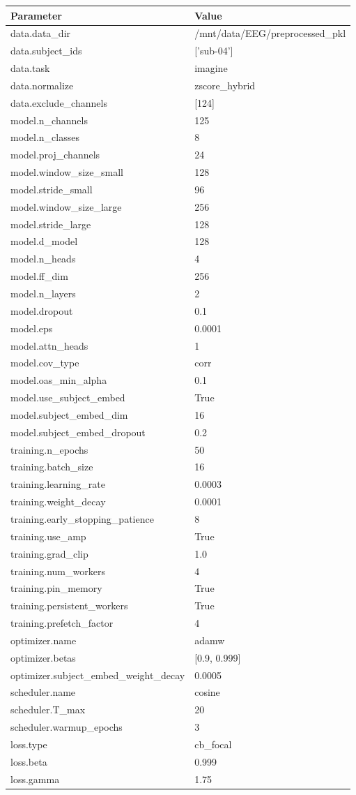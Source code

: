 \begin{tabular}{ll}
\hline
Parameter & Value \\
\hline
data.data_dir & /mnt/data/EEG/preprocessed_pkl \\
data.subject_ids & ['sub-04'] \\
data.task & imagine \\
data.normalize & zscore_hybrid \\
data.exclude_channels & [124] \\
model.n_channels & 125 \\
model.n_classes & 8 \\
model.proj_channels & 24 \\
model.window_size_small & 128 \\
model.stride_small & 96 \\
model.window_size_large & 256 \\
model.stride_large & 128 \\
model.d_model & 128 \\
model.n_heads & 4 \\
model.ff_dim & 256 \\
model.n_layers & 2 \\
model.dropout & 0.1 \\
model.eps & 0.0001 \\
model.attn_heads & 1 \\
model.cov_type & corr \\
model.oas_min_alpha & 0.1 \\
model.use_subject_embed & True \\
model.subject_embed_dim & 16 \\
model.subject_embed_dropout & 0.2 \\
training.n_epochs & 50 \\
training.batch_size & 16 \\
training.learning_rate & 0.0003 \\
training.weight_decay & 0.0001 \\
training.early_stopping_patience & 8 \\
training.use_amp & True \\
training.grad_clip & 1.0 \\
training.num_workers & 4 \\
training.pin_memory & True \\
training.persistent_workers & True \\
training.prefetch_factor & 4 \\
optimizer.name & adamw \\
optimizer.betas & [0.9, 0.999] \\
optimizer.subject_embed_weight_decay & 0.0005 \\
scheduler.name & cosine \\
scheduler.T_max & 20 \\
scheduler.warmup_epochs & 3 \\
loss.type & cb_focal \\
loss.beta & 0.999 \\
loss.gamma & 1.75 \\
\hline
\end{tabular}
